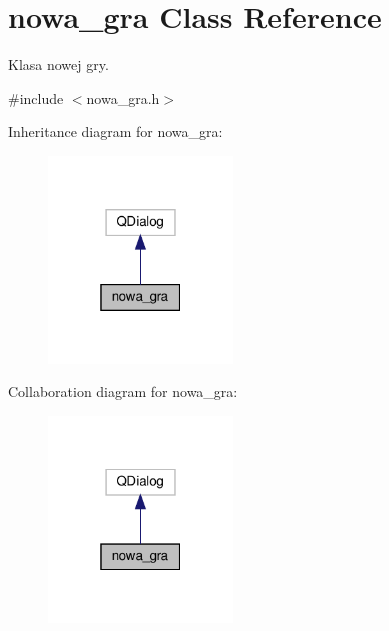\hypertarget{classnowa__gra}{}\section{nowa\+\_\+gra Class Reference}
\label{classnowa__gra}


Klasa nowej gry.  




{\ttfamily \#include $<$nowa\+\_\+gra.\+h$>$}



Inheritance diagram for nowa\+\_\+gra\+:\nopagebreak
\begin{figure}[H]
\begin{center}
\leavevmode
\includegraphics[width=139pt]{classnowa__gra__inherit__graph}
\end{center}
\end{figure}


Collaboration diagram for nowa\+\_\+gra\+:\nopagebreak
\begin{figure}[H]
\begin{center}
\leavevmode
\includegraphics[width=139pt]{classnowa__gra__coll__graph}
\end{center}
\end{figure}
